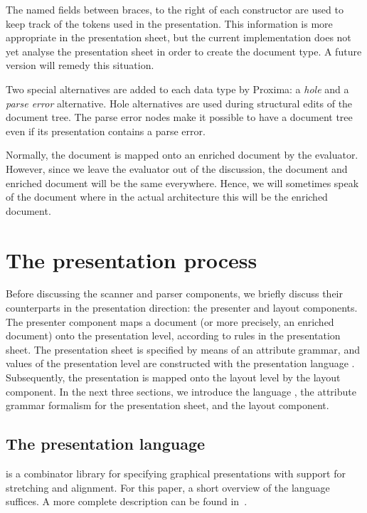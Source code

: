 \documentclass[12pt]{article}
\begin{document}
The named fields between braces, to the right of each constructor are used to keep track of the tokens used in the presentation. This information is more appropriate in the presentation sheet, but the current implementation does not yet analyse the presentation sheet in order to create the document type. A future version will remedy this situation.

Two special alternatives are added to each data type by Proxima: a {\em hole} and a {\em parse error} alternative. Hole alternatives are used during structural edits of the document tree. The parse error nodes make it possible to have a document tree even if its presentation contains a parse error.

Normally, the document is mapped onto an enriched document by the evaluator. However, since we leave the evaluator out of the discussion, the document and enriched document will be the same everywhere. Hence, we will sometimes speak of the document where in the actual architecture this will be the enriched document.






%
\section{The presentation process}\label{sect:presentationProcess}
%

Before discussing the scanner and parser components, we briefly discuss their counterparts in the presentation direction: the presenter and layout components. The presenter component maps a document (or more precisely, an enriched document) onto the presentation level, according to rules in the presentation sheet. The presentation sheet is specified by means of an attribute grammar, and values of the presentation level are constructed with the presentation language \Xprez. Subsequently, the presentation is mapped onto the layout level by the layout component. In the next three sections, we introduce the language \Xprez, the attribute grammar formalism for the presentation sheet, and the layout component.

\subsection{The {\Xprez} presentation language} \label{sect:xprez}

\Xprez is a combinator library for specifying graphical presentations with support for stretching and alignment. For this paper, a short overview of the language suffices. A more complete description can be found in~\cite{schrage04Proxima}.
\end{document}
